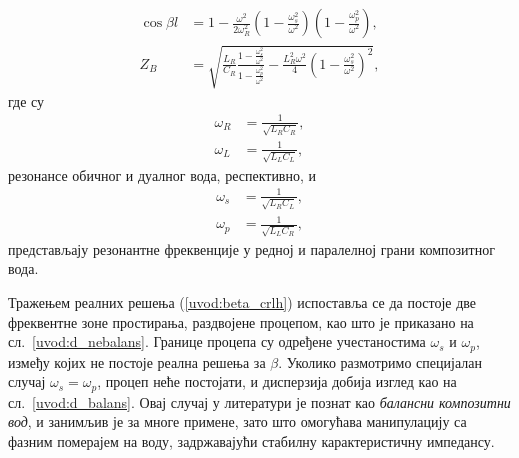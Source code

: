 \begin{align}
    \cos{\beta l} & = 1 - \frac{\omega^2}{2\omega_R^2}\left( 1 - \frac{\omega_s^2}{\omega^2} \right)\left( 1 - \frac{\omega_p^2}{\omega^2} \right),\label{uvod:beta_crlh} \\
    Z_B & = \sqrt{\frac{L_R}{C_R}\frac{1-\frac{\omega_s^2}{\omega^2}}{1-\frac{\omega_p^2}{\omega^2}} - \frac{L_R^2\omega^2}{4}\left( 1 - \frac{\omega_s^2}{\omega^2} \right)^2},
\end{align}
где су
\begin{align}
    \omega_R & = \frac{1}{\sqrt{L_R C_R} },\\
    \omega_L & = \frac{1}{\sqrt{L_L C_L} },
\end{align}
резонансе обичног и дуалног вода, респективно, и
\begin{align}
    \omega_s & = \frac{1}{\sqrt{L_R C_L} },\\
    \omega_p & = \frac{1}{\sqrt{L_L C_R} },
\end{align}
представљају резонантне фреквенције у редној и паралелној грани композитног вода.

Тражењем реалних решења (\ref{uvod:beta_crlh}) испоставља се да постоје две фреквентне зоне простирања, раздвојене процепом, као што је приказано на сл.~\ref{uvod:d_nebalans}. Границе процепа су одређене учестаностима $\omega_s$ и $\omega_p$, између којих не постоје реална решења за $\beta$. Уколико размотримо специјалан случај $\omega_s = \omega_p$, процеп неће постојати, и дисперзија добија изглед као на сл.~\ref{uvod:d_balans}. Овај случај у литератури је познат као \emph{балансни композитни вод}, и занимљив је за многе примене, зато што омогућава манипулацију са фазним померајем на воду, задржавајући стабилну карактеристичну импедансу.

